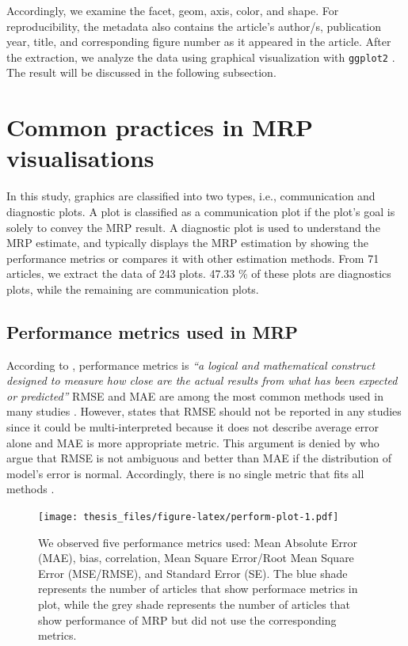 \documentclass{monashthesis}
\begin{document}
Accordingly, we examine the facet, geom, axis, color, and shape. For reproducibility, the metadata also contains the article's author/s, publication year, title, and corresponding figure number as it appeared in the article. After the extraction, we analyze the data using graphical visualization with \texttt{ggplot2} \autocite{ggplot2}. The result will be discussed in the following subsection.

\hypertarget{common-practices-in-mrp-visualisations}{%
\section{Common practices in MRP visualisations}\label{common-practices-in-mrp-visualisations}}

In this study, graphics are classified into two types, i.e., communication and diagnostic plots. A plot is classified as a communication plot if the plot's goal is solely to convey the MRP result. A diagnostic plot is used to understand the MRP estimate, and typically displays the MRP estimation by showing the performance metrics or compares it with other estimation methods. From 71 articles, we extract the data of 243 plots. 47.33 \% of these plots are diagnostics plots, while the remaining are communication plots.

\hypertarget{performance-metrics-used-in-mrp}{%
\subsection{Performance metrics used in MRP}\label{performance-metrics-used-in-mrp}}

According to \textcite{BotchkarevAlexei2019ANTD}, performance metrics is \emph{``a logical and mathematical construct designed to measure how close are the actual results from what has been expected or predicted''} RMSE and MAE are among the most common methods used in many studies \autocite{BotchkarevAlexei2019ANTD}. However, \textcite{WillmottCJ2005Aotm} states that RMSE should not be reported in any studies since it could be multi-interpreted because it does not describe average error alone and MAE is more appropriate metric. This argument is denied by \textcite{ChaiT2014Rmse} who argue that RMSE is not ambiguous and better than MAE if the distribution of model's error is normal. Accordingly, there is no single metric that fits all methods \autocite{ChaiT2014Rmse}.

\begin{figure}
\centering
\texttt{[image: thesis\_files/figure-latex/perform-plot-1.pdf]}
\caption{\label{fig:perform-plot}We observed five performance metrics used: Mean Absolute Error (MAE), bias, correlation, Mean Square Error/Root Mean Square Error (MSE/RMSE), and Standard Error (SE). The blue shade represents the number of articles that show performace metrics in plot, while the grey shade represents the number of articles that show performance of MRP but did not use the corresponding metrics.}
\end{figure}
\end{document}
